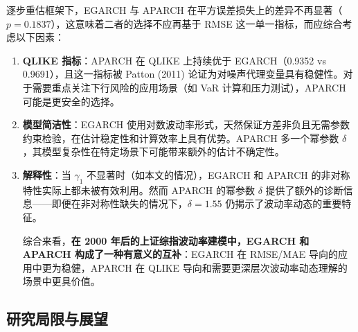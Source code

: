 \documentclass[12pt,a4paper]{article}
\begin{document}
逐步重估框架下，EGARCH 与 APARCH 在平方误差损失上的差异不再显著（$p = 0.1837$），这意味着二者的选择不应再基于 RMSE 这一单一指标，而应综合考虑以下因素：

\begin{enumerate}[nosep,label=(\arabic*)]
    \item \textbf{QLIKE 指标}：APARCH 在 QLIKE 上持续优于 EGARCH（0.9352 vs 0.9691），且这一指标被 Patton (2011) 论证为对噪声代理变量具有稳健性。对于需要重点关注下行风险的应用场景（如 VaR 计算和压力测试），APARCH 可能是更安全的选择。

    \item \textbf{模型简洁性}：EGARCH 使用对数波动率形式，天然保证方差非负且无需参数约束检验，在估计稳定性和计算效率上具有优势。APARCH 多一个幂参数 $\delta$，其模型复杂性在特定场景下可能带来额外的估计不确定性。

    \item \textbf{解释性}：当 $\gamma_1$ 不显著时（如本文的情况），EGARCH 和 APARCH 的非对称特性实际上都未被有效利用。然而 APARCH 的幂参数 $\delta$ 提供了额外的诊断信息——即便在非对称性缺失的情况下，$\delta = 1.55$ 仍揭示了波动率动态的重要特征。

    综合来看，\textbf{在 2000 年后的上证综指波动率建模中，EGARCH 和 APARCH 构成了一种有意义的互补}：EGARCH 在 RMSE/MAE 导向的应用中更为稳健，APARCH 在 QLIKE 导向和需要更深层次波动率动态理解的场景中更具价值。
\end{enumerate}

\subsection{研究局限与展望}
\end{document}
